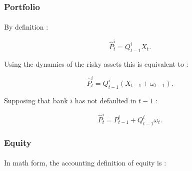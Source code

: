 \documentclass{article}
\begin{document}

\subsubsection{Portfolio}

\paragraph{}


By definition : 

$$\widehat{P}_t^{i} = Q_{t-1}^i X_t.$$

Using the dynamics of the risky assets this is equivalent to : 

$$ \widehat{P}_t^{i} = Q_{t-1}^i (X_{t-1} + \omega_{t-1}).$$

Supposing that bank $i$ has not defaulted in $t-1$ :

\begin{equation}\label{eq:ptf}
\widehat{P}_t^{i} = P_{t-1}^{i} + Q_{t-1}^i \omega_t.
\end{equation}

     



\subsubsection{Equity}

\paragraph{}
In math form, the accounting definition of equity is : 
\end{document}
